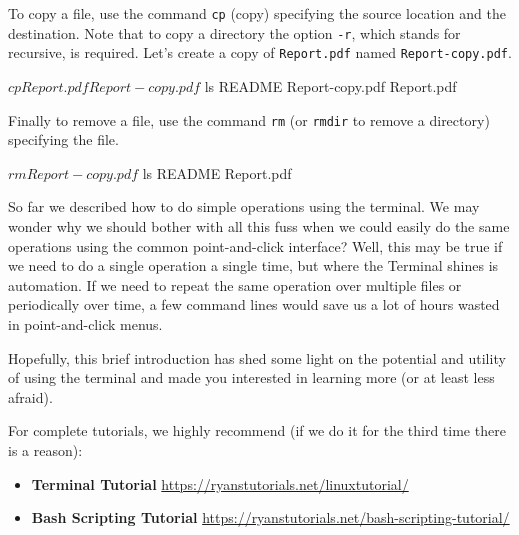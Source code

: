\documentclass[
  11pt,
]{book}
\newenvironment{Shaded}{\begin{snugshade}}{\end{snugshade}}
\newcommand{\ExtensionTok}[1]{#1}
\newcommand{\NormalTok}[1]{#1}
\providecommand{\tightlist}{%
  \setlength{\itemsep}{0pt}\setlength{\parskip}{0pt}}
\begin{document}
To copy a file, use the command \texttt{cp} (copy) specifying the source location and the destination. Note that to copy a directory the option \texttt{-r}, which stands for recursive, is required. Let's create a copy of \texttt{Report.pdf} named \texttt{Report-copy.pdf}.

\begin{Shaded}
\begin{Highlighting}[]
\ExtensionTok{$}\NormalTok{ cp Report.pdf Report{-}copy.pdf}
\ExtensionTok{$}\NormalTok{ ls}
\ExtensionTok{README}\NormalTok{                Report{-}copy.pdf          Report.pdf}
\end{Highlighting}
\end{Shaded}

Finally to remove a file, use the command \texttt{rm} (or \texttt{rmdir} to remove a directory) specifying the file.

\begin{Shaded}
\begin{Highlighting}[]
\ExtensionTok{$}\NormalTok{ rm Report{-}copy.pdf}
\ExtensionTok{$}\NormalTok{ ls}
\ExtensionTok{README}\NormalTok{                Report.pdf}
\end{Highlighting}
\end{Shaded}

So far we described how to do simple operations using the terminal. We may wonder why we should bother with all this fuss when we could easily do the same operations using the common point-and-click interface? Well, this may be true if we need to do a single operation a single time, but where the Terminal shines is automation. If we need to repeat the same operation over multiple files or periodically over time, a few command lines would save us a lot of hours wasted in point-and-click menus.

Hopefully, this brief introduction has shed some light on the potential and utility of using the terminal and made you interested in learning more (or at least less afraid).

For complete tutorials, we highly recommend (if we do it for the third time there is a reason):

\begin{itemize}
\tightlist
\item
  \textbf{Terminal Tutorial} \url{https://ryanstutorials.net/linuxtutorial/}
\item
  \textbf{Bash Scripting Tutorial} \url{https://ryanstutorials.net/bash-scripting-tutorial/}
\end{itemize}
\end{document}
